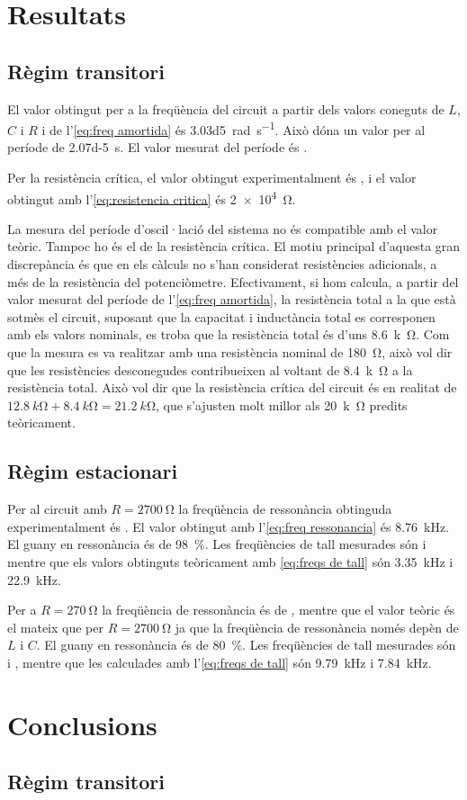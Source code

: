 \section{Resultats}
\subsection{Règim transitori}
El valor obtingut per a la freqüència del circuit a partir dels valors coneguts de \( L \), \( C \) i \( R \) i de l'\cref{eq:freq amortida} és \SI{3.03d5}{rad.s^{-1}}. Això dóna un valor per al període de \SI{2.07d-5}{s}. El valor mesurat del període és .   

Per la resistència crítica, el valor obtingut experimentalment és , i el valor obtingut amb l'\cref{eq:resistencia critica} és \SI{2e4}{\ohm}. 

La mesura del període d'oscil·lació del sistema no és compatible amb el valor teòric. Tampoc ho és el de la resistència crítica. El motiu principal d'aquesta gran discrepància és que en els càlculs no s'han considerat resistències adicionals, a més de la resistència del potenciòmetre. Efectivament, si hom calcula, a partir del valor mesurat del període de l'\cref{eq:freq amortida}, la resistència total a la que està sotmès el circuit, suposant que la capacitat i inductància total es corresponen amb els valors nominals, es troba que la resistència total és d'uns \SI{8.6}{k\ohm}. Com que la mesura es va realitzar amb una resistència nominal de \SI{180}{\ohm}, això vol dir que les resistències desconegudes contribueixen al voltant de \SI{8.4}{k\ohm} a la resistència total. Això vol dir que la resistència crítica del circuit és en realitat de \( \SI{12.8}{k\ohm} + \SI{8.4}{k\ohm} = \SI{21.2}{k\ohm} \), que s'ajusten molt millor als \SI{20}{k\ohm} predits teòricament.  

\subsection{Règim estacionari}
Per al circuit amb \( R = \SI{2700}{\ohm} \) la freqüència de ressonància obtinguda experimentalment és . El valor obtingut amb l'\cref{eq:freq ressonancia} és \SI{8.76}{kHz}. El guany en ressonància és de \SI{98}{\percent}. Les freqüències de tall mesurades són  i  mentre que els valors obtinguts teòricament amb \cref{eq:freqs de tall} són \SI{3.35}{kHz} i \SI{22.9}{kHz}.

Per a \( R = \SI{270}{\ohm} \) la freqüència de ressonància és de , mentre que el valor teòric és el mateix que per \( R = \SI{2700}{\ohm} \) ja que la freqüència de ressonància només depèn de \( L \) i \( C \). El guany en ressonància és de \SI{80}{\percent}. Les freqüències de tall mesurades són  i , mentre que les calculades amb l'\cref{eq:freqs de tall} són \SI{9.79}{kHz} i \SI{7.84}{kHz}.   

\section{Conclusions}
\subsection{Règim transitori}

